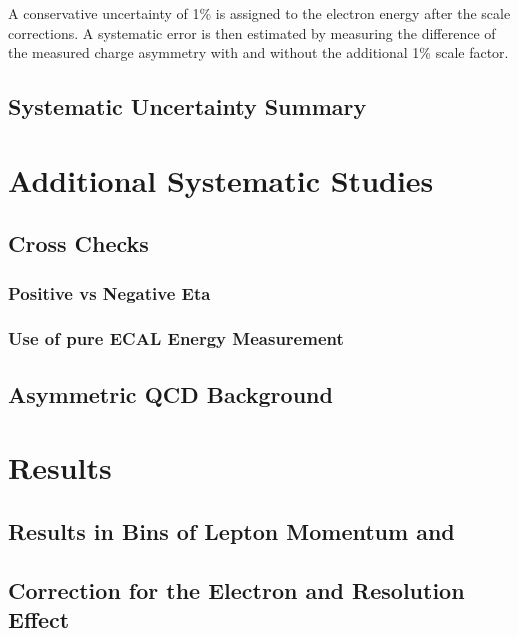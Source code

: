 A conservative uncertainty of \unit{1}{\% } is assigned to the electron energy
after the scale corrections. A systematic error is then estimated by measuring
the difference of the measured charge asymmetry with and without the additional
\unit{1}{\% } scale factor.


\subsection{Systematic Uncertainty Summary}

\section{Additional Systematic Studies}
\subsection{Cross Checks}
\subsubsection{Positive vs Negative Eta}
\subsubsection{Use of pure ECAL Energy Measurement}
\subsection{Asymmetric \ac{QCD} Background}

\section{Results}
\subsection{Results in Bins of Lepton Momentum and \ETm}
\subsection{Correction for the Electron and \ETm Resolution Effect}


